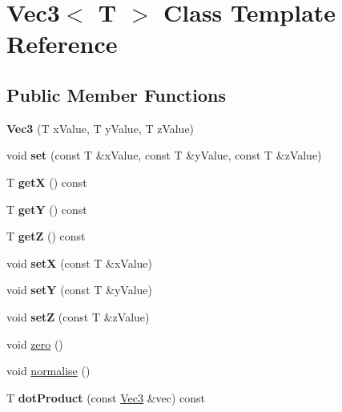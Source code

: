 \hypertarget{classVec3}{}\section{Vec3$<$ T $>$ Class Template Reference}
\label{classVec3}
\subsection*{Public Member Functions}
\begin{DoxyCompactItemize}
\item 
\hypertarget{classVec3_ae5f1be1f4936b564b8ef760dded77f93}{}{\bfseries Vec3} (T x\+Value, T y\+Value, T z\+Value)\label{classVec3_ae5f1be1f4936b564b8ef760dded77f93}

\item 
\hypertarget{classVec3_a9003d0d159f619d62400cf865ca9d47b}{}void {\bfseries set} (const T \&x\+Value, const T \&y\+Value, const T \&z\+Value)\label{classVec3_a9003d0d159f619d62400cf865ca9d47b}

\item 
\hypertarget{classVec3_a0b82143ab072d3215ded4100e9fa38f9}{}T {\bfseries get\+X} () const \label{classVec3_a0b82143ab072d3215ded4100e9fa38f9}

\item 
\hypertarget{classVec3_a351092c8c47c6974ff607a4e03669990}{}T {\bfseries get\+Y} () const \label{classVec3_a351092c8c47c6974ff607a4e03669990}

\item 
\hypertarget{classVec3_aa9e9b1e64b0e8eec03c1d4d966e7e0e4}{}T {\bfseries get\+Z} () const \label{classVec3_aa9e9b1e64b0e8eec03c1d4d966e7e0e4}

\item 
\hypertarget{classVec3_a21ee2109bbc2148c61a24b9dafcc12d6}{}void {\bfseries set\+X} (const T \&x\+Value)\label{classVec3_a21ee2109bbc2148c61a24b9dafcc12d6}

\item 
\hypertarget{classVec3_a84a46865f7c4c2bed1305406485ee14f}{}void {\bfseries set\+Y} (const T \&y\+Value)\label{classVec3_a84a46865f7c4c2bed1305406485ee14f}

\item 
\hypertarget{classVec3_a11b21f7d675879b42aaf278031d8b012}{}void {\bfseries set\+Z} (const T \&z\+Value)\label{classVec3_a11b21f7d675879b42aaf278031d8b012}

\item 
void \hyperlink{classVec3_af7bb8aacd55941d3969edf51c4e82179}{zero} ()
\item 
void \hyperlink{classVec3_a57837eb6a03008ae0b9efe1752ed3493}{normalise} ()
\item 
\hypertarget{classVec3_a53a0ae330851ec3bb92155ba388ff967}{}T {\bfseries dot\+Product} (const \hyperlink{classVec3}{Vec3} \&vec) const \label{classVec3_a53a0ae330851ec3bb92155ba388ff967}


\end{DoxyCompactItemize}
